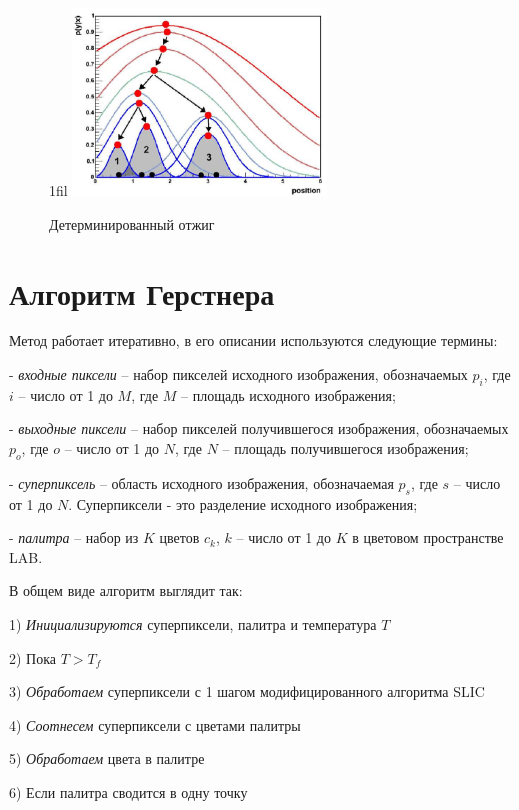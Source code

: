 \documentclass[a4paper,12pt]{report}
\makeatletter
\theoremstyle{remark}
\newcommand*{\centerfloat}{%
  \parindent \z@
  \leftskip \z@ \@plus 1fil \@minus \textwidth
  \rightskip\leftskip
  \parfillskip \z@skip}
\makeatother
\begin{document}
\begin{figure}
    \centerfloat
    \includegraphics[width=0.6\textwidth]{pixel/da.png}
    \caption{Детерминированный отжиг}
    \label{fig:da}
\end{figure}

\section{Алгоритм Герстнера}

Метод\citep{pixel} работает итеративно, в его описании используются следующие термины:

- \textit{входные пиксели} – набор пикселей исходного изображения, обозначаемых $p_i$, где $i$ – число от 1 до $M$, где $M$ – площадь исходного изображения; 

- \textit{выходные пиксели} – набор пикселей получившегося изображения, обозначаемых $p_o$, где $o$ – число от 1 до $N$, где $N$ – площадь получившегося изображения; 

- \textit{суперпиксель} – область исходного изображения, обозначаемая $p_s$, где $s$ – число от 1 до $N$. Суперпиксели - это разделение исходного изображения;

- \textit{палитра} – набор из $K$ цветов $c_k$, $k$ – число от 1 до $K$ в цветовом пространстве LAB.

В общем виде алгоритм выглядит так:

1)  \textit{Инициализируются} суперпиксели, палитра и температура $T$

2)  Пока $T > T_f$

3)      \textit{Обработаем} суперпиксели с 1 шагом модифицированного алгоритма SLIC

4)      \textit{Соотнесем} суперпиксели с цветами палитры

5)      \textit{Обработаем} цвета в палитре

6)      Если палитра сводится в одну точку
\end{document}
